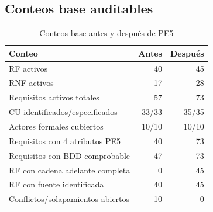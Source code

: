 \documentclass[11pt,a4paper]{article}
\begin{document}
	\subsection{Conteos base auditables}
	\begin{table}[H]\centering\caption{Conteos base antes y después de PE5}\label{tab:conteos}
		\begin{tabular}{lrr}\toprule\textbf{Conteo}&\textbf{Antes}&\textbf{Después}\\\midrule
			RF activos&40&45\\
			RNF activos&17&28\\
			Requisitos activos totales&57&73\\
			CU identificados/especificados&33/33&35/35\\
			Actores formales cubiertos&10/10&10/10\\
			Requisitos con 4 atributos PE5&40&73\\
			Requisitos con BDD comprobable&47&73\\
			RF con cadena adelante completa&0&45\\
			RF con fuente identificada&40&45\\
			Conflictos/solapamientos abiertos&10&0\\\bottomrule\end{tabular}\end{table}
	
\end{document}
